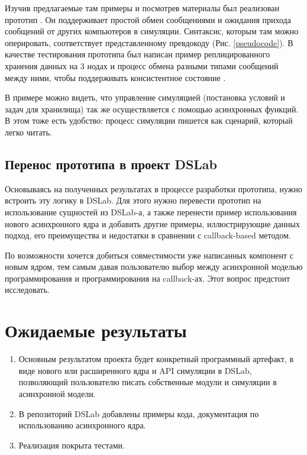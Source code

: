 Изучив предлагаемые там примеры и посмотрев материалы был реализован прототип \cite{my-demo}. Он поддерживает простой обмен сообщениями и ожидания прихода сообщений от других компьютеров в симуляции. Синтаксис, которым там можно оперировать, соответствует представленному превдокоду (Рис. \ref{pseudocode}). В качестве тестирования прототипа был написан пример реплицированного хранения данных на 3 нодах и процесс обмена разными типами сообщений между ними, чтобы поддерживать консистентное состояние \cite{my-demo-replicas}. 

В примере можно видеть, что управление симуляцией (постановка условий и задач для хранилища) так же осуществляется с помощью асинхронных функций. В этом тоже есть удобство: процесс симуляции пишется как сценарий, который легко читать. 

\subsection{Перенос прототипа в проект DSLab}

Основываясь на полученных результатах в процессе разработки прототипа, нужно встроить эту логику в DSLab. Для этого нужно перевести прототип на использование сущностей из DSLab-а, а также перенести пример использования нового асинхронного ядра и добавить другие примеры, иллюстрирующие данных подход, его преимущества и недостатки в сравнении с callback-based методом. 

По возможности хочется добиться совместимости уже написанных компонент с новым ядром, тем самым давая пользователю выбор между асинхронной моделью программирования и программирования на callback-ах. Этот вопрос предстоит исследовать. 

\section{Ожидаемые результаты}

\begin{enumerate}
    \item 
    Основным результатом проекта будет конкретный программный артефакт, в виде нового или расширенного ядра и API симуляции в DSLab, позволяющий пользователю писать собственные модули и симуляции в асинхронной модели. 
    \item В репозиторий DSLab \cite{dslab-repo} добавлены примеры кода, документация по использованию асинхронного ядра.
    \item Реализация покрыта тестами.
\end{enumerate}
    
